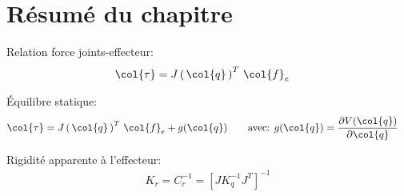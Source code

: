 \newpage
\section{Résumé du chapitre}


Relation force joints-effecteur:
\begin{align}
\col{\tau} &= J\left( \, \col{q} \, \right)^T \, \col{f}_e 
\end{align}

Équilibre statique:
\begin{align}
\col{\tau} &= J\left( \, \col{q} \, \right)^T \, \col{f}_e +  g( \col{q} )
\quad \quad \text{avec:  }
g( \col{q} ) = 
\frac{ \partial V(\col{q} ) }{\partial \col{q} } 
\end{align}

Rigidité apparente à l'effecteur:
\begin{align}
K_r = C_r^{-1} = \left[ J K_q^{-1} J^T \right]^{-1}
\end{align}
